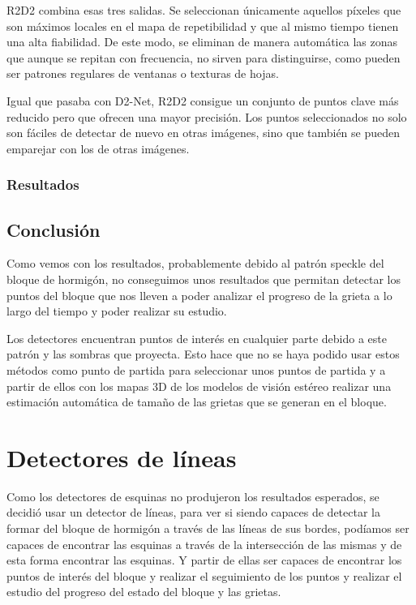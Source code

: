 R2D2 combina esas tres salidas. Se seleccionan únicamente aquellos píxeles que son máximos locales en el mapa de repetibilidad y que al mismo tiempo tienen una alta fiabilidad. De este modo, se eliminan de manera automática las zonas que aunque se repitan con frecuencia, no sirven para distinguirse, como pueden ser patrones regulares de ventanas o texturas de hojas.    

Igual que pasaba con D2-Net, R2D2 consigue un conjunto de puntos clave más reducido pero que ofrecen una mayor precisión. Los puntos seleccionados no solo son fáciles de detectar de nuevo en otras imágenes, sino que también se pueden emparejar con los de otras imágenes.


\subsubsection{Resultados}


\subsection{Conclusión}
Como vemos con los resultados, probablemente debido al patrón speckle del bloque de hormigón, no conseguimos unos resultados que permitan detectar los puntos del bloque que nos lleven a poder analizar el progreso de la grieta a lo largo del tiempo y poder realizar su estudio.

Los detectores encuentran puntos de interés en cualquier parte debido a este patrón y las sombras que proyecta. Esto hace que no se haya podido usar estos métodos como punto de partida para seleccionar unos puntos de partida y a partir de ellos con los mapas 3D de los modelos de visión estéreo realizar una estimación automática de tamaño de las grietas que se generan en el bloque.

\section{Detectores de líneas}
Como los detectores de esquinas no produjeron los resultados esperados, se decidió usar un detector de líneas, para ver si siendo capaces de detectar la formar del bloque de hormigón a través de las líneas de sus bordes, podíamos ser capaces de encontrar las esquinas a través de la intersección de las mismas y de esta forma encontrar las esquinas. Y partir de ellas ser capaces de encontrar los puntos de interés del bloque y realizar el seguimiento de los puntos y realizar el estudio del progreso del estado del bloque y las grietas.

